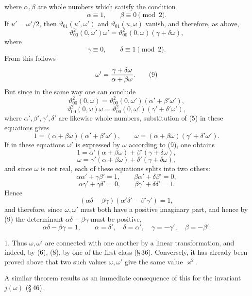 \documentclass[11pt]{article}
\providecommand{\tht}{\vartheta}
\begin{document}
where $\alpha,\beta$ are whole numbers which satisfy the condition
\begin{equation}
\alpha\equiv1,
\qquad
\beta\equiv0\pmod 2.
\tag{6}
\end{equation}
If $u'=\omega'/2$, then $\tht_{01}(u',\omega')$ and $\tht_{01}(u,\omega)$ vanish, and therefore, as above,
\begin{equation}
\tht_{00}^2(0,\omega')\omega'=\tht_{00}^2(0,\omega)(\gamma+\delta\omega),
\tag{7}
\end{equation}
where
\begin{equation}
\gamma\equiv0,
\qquad
\delta\equiv1\pmod 2.
\tag{8}
\end{equation}
From this follows
\begin{equation}
\omega'={\gamma+\delta\omega\over\alpha+\beta\omega}.
\tag{9}
\end{equation}
But since in the same way one can conclude
\[
\tht_{00}^2(0,\omega)=\tht_{00}^2(0,\omega')(\alpha'+\beta'\omega'),
\]
\[
\tht_{00}^2(0,\omega)\omega=\tht_{00}^2(0,\omega')(\gamma'+\delta'\omega'),
\]
where $\alpha',\beta',\gamma',\delta'$ are likewise whole numbers, substitution of (5) in these equations gives
\[
1=(\alpha+\beta\omega)(\alpha'+\beta'\omega'),
\qquad
\omega=(\alpha+\beta\omega)(\gamma'+\delta'\omega').
\]
If in these equations $\omega'$ is expressed by $\omega$ according to (9), one obtains
\[
1=\alpha'(\alpha+\beta\omega)+\beta'(\gamma+\delta\omega),
\]
\[
\omega=\gamma'(\alpha+\beta\omega)+\delta'(\gamma+\delta\omega),
\]
and since $\omega$ is not real, each of these equations splits into two others:
\[
\alpha\alpha'+\gamma\beta'=1,
\qquad
\beta\alpha'+\delta\beta'=0,
\]
\[
\alpha\gamma'+\gamma\delta'=0,
\qquad
\beta\gamma'+\delta\delta'=1.
\]
Hence
\[
(\alpha\delta-\beta\gamma)(\alpha'\delta'-\beta'\gamma')=1,
\]
and therefore, since $\omega,\omega'$ must both have a positive imaginary part, and hence by (9) the determinant $\alpha\delta-\beta\gamma$ must be positive,
\[
\alpha\delta-\beta\gamma=1,
\qquad
\alpha=\delta',\quad \delta=\alpha',\quad \gamma=-\gamma',\quad \beta=-\beta'.
\]

1. Thus $\omega,\omega'$ are connected with one another by a linear transformation, and indeed, by (6), (8), by one of the first class (\S\,36). Conversely, it has already been proved above that two such values $\omega,\omega'$ give the same value $\varkappa^2$.

A similar theorem results as an immediate consequence of this for the invariant $j(\omega)$ (\S\,46).
\end{document}
